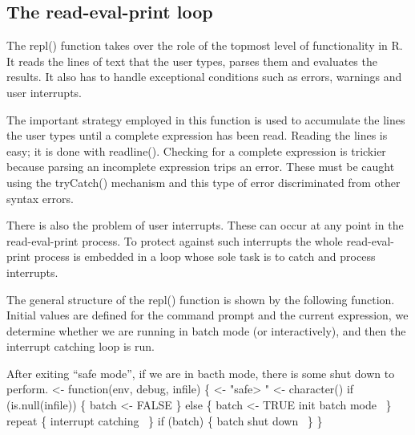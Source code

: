 \documentclass[a4paper]{article}%
\begin{document}
\subsection{The read-eval-print loop}
\label{sec:the-read-eval-print-loop}

The {\Tt{}repl()\nwendquote} function takes over the role of the topmost level of
functionality in R.  It reads the lines of text that the user types,
parses them and evaluates the results.  It also has to handle
exceptional conditions such as errors, warnings and user interrupts.

The important strategy employed in this function
is used to accumulate the lines the user types
until a complete expression has been read.  Reading the lines is easy;
it is done with {\Tt{}readline()\nwendquote}.  Checking for a complete expression
is trickier because parsing an incomplete expression trips an error.
These must be caught using the {\Tt{}tryCatch()\nwendquote} mechanism and this
type of error discriminated from other syntax errors.

There is also the problem of user interrupts.  These can occur at any
point in the read-eval-print process. To protect against such
interrupts the whole read-eval-print process is embedded in a loop
whose sole task is to catch and process interrupts.

The general structure of the {\Tt{}repl()\nwendquote} function is shown by the
following function.  Initial values are defined for the
command prompt and the current expression, we determine whether
we are running in batch mode (or interactively), and then the interrupt
catching loop is run.

After exiting ``safe mode'', if we are in bacth mode, there is some
shut down to perform.
\nwenddocs{}\endmoddef\nwstartdeflinemarkup{}\nwenddeflinemarkup
{} <- function(env, debug, infile) \{
     <- "safe> "
     <- character()
    if (is.null(infile)) \{
        batch <- FALSE
    \} else \{
        batch <- TRUE
        \LA{}init batch mode~{\nwtagstyle{}}\RA{}
    \}
    repeat \{
        \LA{}interrupt catching~{\nwtagstyle{}}\RA{}
    \}
    if (batch) \{
        \LA{}batch shut down~{\nwtagstyle{}}\RA{}
    \}
\}
\end{document}
